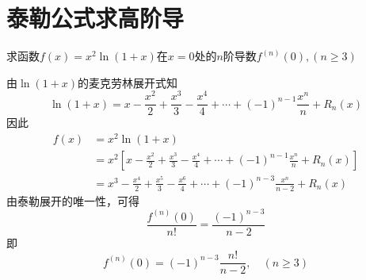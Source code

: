 \documentclass[12pt, a4paper, oneside, UTF8]{ctexbook}
\begin{document}
\section{泰勒公式求高阶导}
\begin{example}
    求函数$f(x)=x^2 \ln(1+x)$在$x=0$处的$n$阶导数$f^{(n)}(0),(n \geq 3)$
\end{example}
\begin{solution}
    由$\ln(1+x)$的麦克劳林展开式知
    \[
        \ln(1+x)=x - \frac{x^2}{2} + \frac{x^3}{3} - \frac{x^4}{4} + \cdots + (-1)^{n-1}\frac{x^n}{n} + R_n (x)
    \]
    因此
    \begin{align*}
        f(x)&=x^2 \ln(1+x)\\
        &=x^2\left[x - \frac{x^2}{2} + \frac{x^3}{3} - \frac{x^4}{4} + \cdots + (-1)^{n-1}\frac{x^n}{n} + R_n (x)\right]\\
        &=x^3 - \frac{x^4}{2} + \frac{x^5}{3} - \frac{x^6}{4} + \cdots + (-1)^{n-3}\frac{x^{n}}{n-2} + R_n (x)
    \end{align*}
    由泰勒展开的唯一性，可得
    \[
        \dfrac{f^{(n)}(0)}{n!}=\dfrac{(-1)^{n-3}}{n-2}
    \]
    即
    \[
        \boxed{f^{(n)}(0)=(-1)^{n-3}\dfrac{n!}{n-2}}, \quad (n \geq 3)
    \]
\end{solution}
\end{document}
